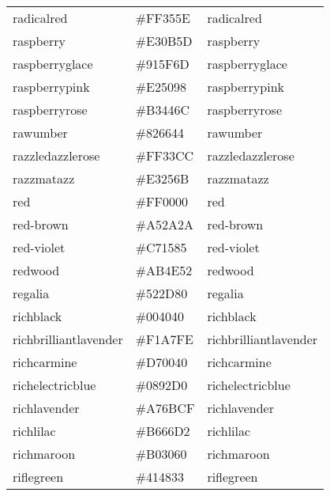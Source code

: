 \documentclass[
]{article}
\begin{document}
\begin{longtable}[]{@{}lll@{}}
radicalred & \colorbox[rgb]{1.0,0.21,0.37}{\#FF355E} &
\textcolor[rgb]{1.0,0.21,0.37}{radicalred            }\tabularnewline
raspberry & \colorbox[rgb]{0.89,0.04,0.36}{\#E30B5D} &
\textcolor[rgb]{0.89,0.04,0.36}{raspberry             }\tabularnewline
raspberryglace & \colorbox[rgb]{0.57,0.37,0.43}{\#915F6D} &
\textcolor[rgb]{0.57,0.37,0.43}{raspberryglace        }\tabularnewline
raspberrypink & \colorbox[rgb]{0.89,0.31,0.61}{\#E25098} &
\textcolor[rgb]{0.89,0.31,0.61}{raspberrypink         }\tabularnewline
raspberryrose & \colorbox[rgb]{0.7,0.27,0.42}{\#B3446C} &
\textcolor[rgb]{0.7,0.27,0.42}{raspberryrose         }\tabularnewline
rawumber & \colorbox[rgb]{0.51,0.4,0.27}{\#826644} &
\textcolor[rgb]{0.51,0.4,0.27}{rawumber              }\tabularnewline
razzledazzlerose & \colorbox[rgb]{1.0,0.2,0.8}{\#FF33CC} &
\textcolor[rgb]{1.0,0.2,0.8}{razzledazzlerose      }\tabularnewline
razzmatazz & \colorbox[rgb]{0.89,0.15,0.42}{\#E3256B} &
\textcolor[rgb]{0.89,0.15,0.42}{razzmatazz            }\tabularnewline
red & \colorbox[rgb]{1.0,0.0,0.0}{\#FF0000} &
\textcolor[rgb]{1.0,0.0,0.0}{red                   }\tabularnewline
red-brown & \colorbox[rgb]{0.65,0.16,0.16}{\#A52A2A} &
\textcolor[rgb]{0.65,0.16,0.16}{red-brown             }\tabularnewline
red-violet & \colorbox[rgb]{0.78,0.08,0.52}{\#C71585} &
\textcolor[rgb]{0.78,0.08,0.52}{red-violet            }\tabularnewline
redwood & \colorbox[rgb]{0.67,0.31,0.32}{\#AB4E52} &
\textcolor[rgb]{0.67,0.31,0.32}{redwood               }\tabularnewline
regalia & \colorbox[rgb]{0.32,0.18,0.5}{\#522D80} &
\textcolor[rgb]{0.32,0.18,0.5}{regalia               }\tabularnewline
richblack & \colorbox[rgb]{0.0,0.25,0.25}{\#004040} &
\textcolor[rgb]{0.0,0.25,0.25}{richblack             }\tabularnewline
richbrilliantlavender & \colorbox[rgb]{0.95,0.65,1.0}{\#F1A7FE} &
\textcolor[rgb]{0.95,0.65,1.0}{richbrilliantlavender }\tabularnewline
richcarmine & \colorbox[rgb]{0.84,0.0,0.25}{\#D70040} &
\textcolor[rgb]{0.84,0.0,0.25}{richcarmine           }\tabularnewline
richelectricblue & \colorbox[rgb]{0.03,0.57,0.82}{\#0892D0} &
\textcolor[rgb]{0.03,0.57,0.82}{richelectricblue      }\tabularnewline
richlavender & \colorbox[rgb]{0.67,0.38,0.8}{\#A76BCF} &
\textcolor[rgb]{0.67,0.38,0.8}{richlavender          }\tabularnewline
richlilac & \colorbox[rgb]{0.71,0.4,0.82}{\#B666D2} &
\textcolor[rgb]{0.71,0.4,0.82}{richlilac             }\tabularnewline
richmaroon & \colorbox[rgb]{0.69,0.19,0.38}{\#B03060} &
\textcolor[rgb]{0.69,0.19,0.38}{richmaroon            }\tabularnewline
riflegreen & \colorbox[rgb]{0.25,0.28,0.2}{\#414833} &
\textcolor[rgb]{0.25,0.28,0.2}{riflegreen            }\tabularnewline

\end{longtable}
\end{document}

